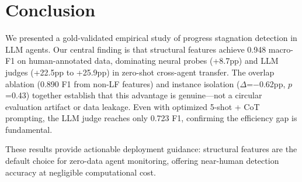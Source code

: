 \documentclass[11pt,a4paper]{article}
\begin{document}
\section{Conclusion}
\label{sec:conclusion}

We presented a gold-validated empirical study of progress stagnation detection in LLM agents.
Our central finding is that structural features achieve 0.948 macro-F1 on human-annotated data, dominating neural probes (+8.7pp) and LLM judges (+22.5pp to +25.9pp) in zero-shot cross-agent transfer.
The overlap ablation (0.890 F1 from non-LF features) and instance isolation ($\Delta$=$-$0.62pp, $p$=0.43) together establish that this advantage is genuine---not a circular evaluation artifact or data leakage.
Even with optimized 5-shot + CoT prompting, the LLM judge reaches only 0.723 F1, confirming the efficiency gap is fundamental.

These results provide actionable deployment guidance: structural features are the default choice for zero-data agent monitoring, offering near-human detection accuracy at negligible computational cost.
\end{document}
